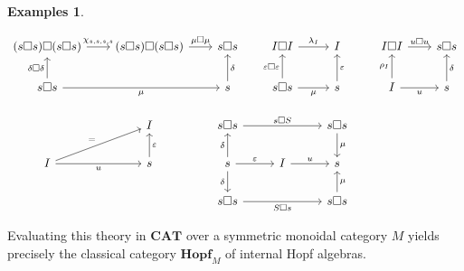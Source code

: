 \documentclass[11pt]{article}
\theoremstyle{plain}
\theoremstyle{definition}
\newtheorem{examples}[theorem]{Examples}
\numberwithin{equation}{section}
\begin{document}
\begin{examples}
\begin{enumerate}
{$$\begin{tikzcd}[column sep = 0.7 cm]
(s\square s)\square (s\square s) \arrow[r, "{\chi_{s,s,s,s}}"]                 & (s\square s)\square (s\square s) \arrow[r, "\mu\square \mu"] & s\square s                                                          & I\square I \arrow[r, "\lambda_I"]                                        & I                                                                               & I\square I \arrow[r, "u\square u"]     & s\square s             \\
s\square s \arrow[u, "\delta\square \delta"] \arrow[rr, "\mu"']                &                                                              & s \arrow[u, "\delta"']                                              & s\square s \arrow[r, "\mu"'] \arrow[u, "\varepsilon\square \varepsilon"] & s \arrow[u, "\varepsilon"']                                                     & I \arrow[r, "u"'] \arrow[u, "\rho_I"]  & s \arrow[u, "\delta"'] \\
                                                                               & I                                                            & s\square s \arrow[rr, "s\square S"]                                 &                                                                          & s\square s \arrow[d, "\mu"]                                                     &                                        &                        \\
I \arrow[r, "u"'] \arrow[ru, "="]                                              & s \arrow[u, "\varepsilon"']                                  & s \arrow[r, "\varepsilon"] \arrow[u, "\delta"] \arrow[d, "\delta"'] & I \arrow[r, "u"]                                                         & s                                                                               &                                        &                        \\
                                                                               &                                                              & s\square s \arrow[rr, "S\square s"']                                &                                                                          & s\square s \arrow[u, "\mu"']                                                    &                                        &                       
\end{tikzcd}
$$
}

    
    Evaluating this theory in $\mathbf{CAT}$ over a symmetric monoidal category $M$ yields precisely the classical category $\mathbf{Hopf}_M$ of internal Hopf algebras.


\end{enumerate}
\end{examples}
\end{document}
